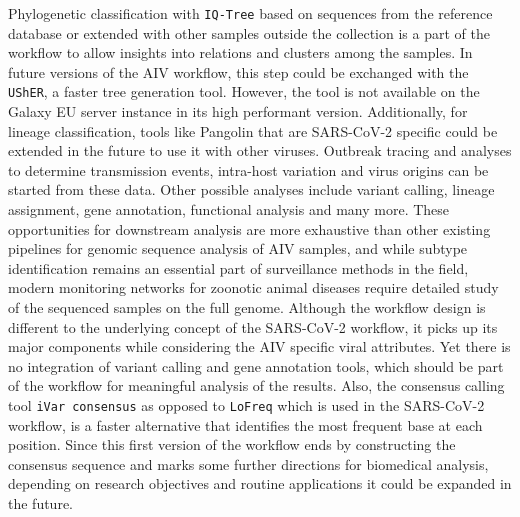 Phylogenetic classification with \texttt{IQ-Tree} based on sequences from the reference database or extended with other samples outside the collection is a part of the workflow to allow insights into relations and clusters among the samples. In future versions of the \ac{AIV} workflow, this step could be exchanged with the \texttt{UShER}, a faster tree generation tool. However, the tool is not available on the Galaxy EU server instance in its high performant version. Additionally, for lineage classification, tools like Pangolin that are \ac{SARS-CoV-2} specific could be extended in the future to use it with other viruses. Outbreak tracing and analyses to determine transmission events, intra-host variation and virus origins can be started from these data. Other possible analyses include variant calling, lineage assignment, gene annotation, functional analysis and many more. These opportunities for downstream analysis are more exhaustive than other existing pipelines for genomic sequence analysis of \ac{AIV} samples, and while subtype identification remains an essential part of surveillance methods in the field, modern monitoring networks for zoonotic animal diseases require detailed study of the sequenced samples on the full genome. Although the workflow design is different to the underlying concept of the \ac{SARS-CoV-2} workflow, it picks up its major components while considering the \ac{AIV} specific viral attributes. Yet there is no integration of variant calling and gene annotation tools, which should be part of the workflow for meaningful analysis of the results. Also, the consensus calling tool \texttt{iVar consensus} as opposed to \texttt{LoFreq} which is used in the \ac{SARS-CoV-2} workflow, is a faster alternative that identifies the most frequent base at each position. Since this first version of the workflow ends by constructing the consensus sequence and marks some further directions for biomedical analysis, depending on research objectives and routine applications it could be expanded in the future. 


